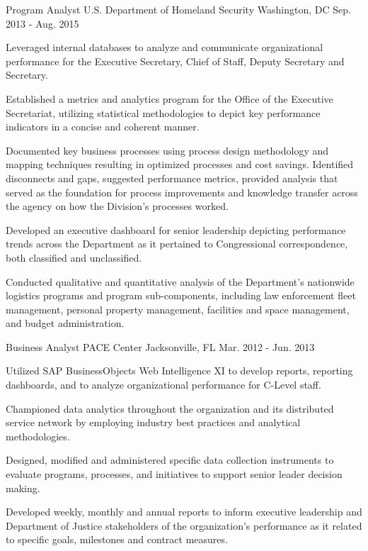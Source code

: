 \begin{cventries}
  \cventry
    {Program Analyst} %
    {U.S. Department of Homeland Security} %
    {Washington, DC} %
    {Sep. 2013 - Aug. 2015} %
    {
      \begin{cvitems} %
        \item {Leveraged internal databases to analyze and communicate organizational performance for the Executive Secretary, Chief of Staff, Deputy Secretary and Secretary.}
        \item {Established a metrics and analytics program for the Office of the Executive Secretariat, utilizing statistical methodologies to depict key performance indicators in a concise and coherent manner.}
        \item {Documented key business processes using process design methodology and mapping techniques resulting in optimized processes and cost savings. Identified disconnects and gaps, suggested performance metrics, provided analysis that served as the foundation for process improvements and knowledge transfer across the agency on how the Division's processes worked.}
        \item {Developed an executive dashboard for senior leadership depicting performance trends across the Department as it pertained to Congressional correspondence, both classified and unclassified.}
        \item {Conducted qualitative and quantitative analysis of the Department’s nationwide logistics programs and program sub-components, including law enforcement fleet management, personal property management, facilities and space management, and budget administration.}
      \end{cvitems}
    }

  \cventry
    {Business Analyst} %
    {PACE Center} %
    {Jacksonville, FL} %
    {Mar. 2012 - Jun. 2013} %
    {
      \begin{cvitems} %
        \item {Utilized SAP BusinessObjects Web Intelligence XI to develop reports, reporting dashboards, and to analyze organizational performance for C-Level staff.}
        \item {Championed data analytics throughout the organization and its distributed service network by employing industry best practices and analytical methodologies.}
        \item {Designed, modified and administered specific data collection instruments to evaluate programs, processes, and initiatives to support senior leader decision making.}
        \item {Developed weekly, monthly and annual reports to inform executive leadership and Department of Justice stakeholders of the organization's performance as it related to specific goals, milestones and contract measures.}
      \end{cvitems}
    }


\end{cventries}
